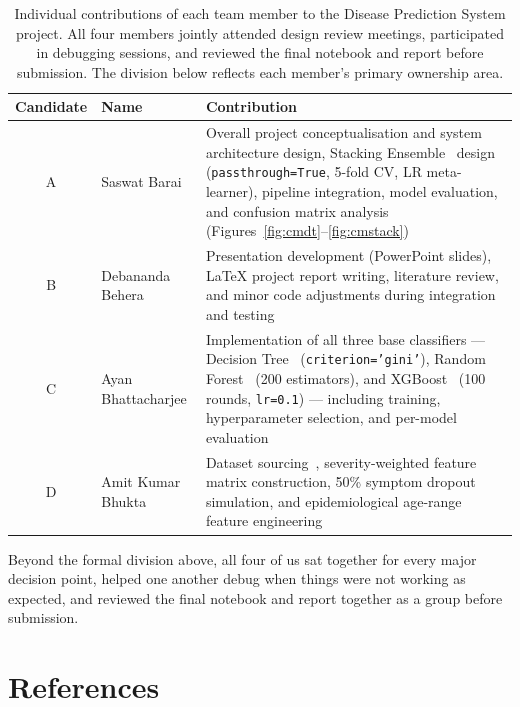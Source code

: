 \documentclass[12pt,a4paper]{article}
\begin{document}
\begin{table}[H]
\centering
\caption{Individual contributions of each team member to the Disease Prediction System
project. All four members jointly attended design review meetings, participated in
debugging sessions, and reviewed the final notebook and report before submission.
The division below reflects each member's primary ownership area.}
\label{tab:team}
\small
\begin{tabular}{|c|p{3.5cm}|p{7.8cm}|}
\hline
\textbf{Candidate} & \textbf{Name} & \textbf{Contribution} \\
\hline
A & Saswat Barai & Overall project conceptualisation and system architecture design,
            Stacking Ensemble~\cite{wolpert1992} design (\texttt{passthrough=True}, 5-fold CV,
            LR meta-learner), pipeline integration, model evaluation, and confusion matrix
            analysis (Figures~\ref{fig:cmdt}--\ref{fig:cmstack}) \\
\hline
B & Debananda Behera & Presentation development (PowerPoint slides), \LaTeX{} project report
            writing, literature review, and minor code adjustments during integration
            and testing \\
\hline
C & Ayan Bhattacharjee & Implementation of all three base classifiers ---
            Decision Tree~\cite{quinlan1986} (\texttt{criterion='gini'}),
            Random Forest~\cite{breiman2001} (200 estimators),
            and XGBoost~\cite{chen2016xgboost} (100 rounds, \texttt{lr=0.1}) ---
            including training, hyperparameter selection, and per-model evaluation \\
\hline
D & Amit Kumar Bhukta & Dataset sourcing~\cite{itachi2020,ammistic2023},
            severity-weighted feature matrix construction, 50\% symptom dropout
            simulation, and epidemiological age-range feature engineering \\
\hline
\end{tabular}
\end{table}

Beyond the formal division above, all four of us sat together for every major decision point, helped one another debug when things were not working as expected, and reviewed the final notebook and report together as a group before submission.

\section{References}
\end{document}
